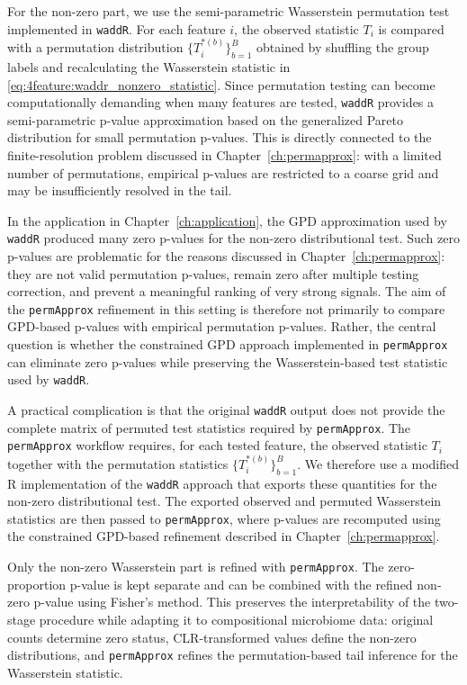 For the non-zero part, we use the semi-parametric Wasserstein permutation test implemented in \texttt{waddR}. For each feature $i$, the observed statistic $T_i$ is compared with a permutation distribution $\{T_i^{*(b)}\}_{b=1}^B$ obtained by shuffling the group labels and recalculating the Wasserstein statistic in \eqref{eq:4feature:waddr_nonzero_statistic}. Since permutation testing can become computationally demanding when many features are tested, \texttt{waddR} provides a semi-parametric p-value approximation based on the generalized Pareto distribution for small permutation p-values. This is directly connected to the finite-resolution problem discussed in Chapter~\ref{ch:permapprox}: with a limited number of permutations, empirical p-values are restricted to a coarse grid and may be insufficiently resolved in the tail.

In the application in Chapter~\ref{ch:application}, the GPD approximation used by \texttt{waddR} produced many zero p-values for the non-zero distributional test. Such zero p-values are problematic for the reasons discussed in Chapter~\ref{ch:permapprox}: they are not valid permutation p-values, remain zero after multiple testing correction, and prevent a meaningful ranking of very strong signals. The aim of the \texttt{permApprox} refinement in this setting is therefore not primarily to compare GPD-based p-values with empirical permutation p-values. Rather, the central question is whether the constrained GPD approach implemented in \texttt{permApprox} can eliminate zero p-values while preserving the Wasserstein-based test statistic used by \texttt{waddR}.

A practical complication is that the original \texttt{waddR} output does not provide the complete matrix of permuted test statistics required by \texttt{permApprox}. The \texttt{permApprox} workflow requires, for each tested feature, the observed statistic $T_i$ together with the permutation statistics $\{T_i^{*(b)}\}_{b=1}^B$. We therefore use a modified R implementation of the \texttt{waddR} approach that exports these quantities for the non-zero distributional test. The exported observed and permuted Wasserstein statistics are then passed to \texttt{permApprox}, where p-values are recomputed using the constrained GPD-based refinement described in Chapter~\ref{ch:permapprox}.

Only the non-zero Wasserstein part is refined with \texttt{permApprox}. The zero-proportion p-value is kept separate and can be combined with the refined non-zero p-value using Fisher's method. This preserves the interpretability of the two-stage procedure while adapting it to compositional microbiome data: original counts determine zero status, CLR-transformed values define the non-zero distributions, and \texttt{permApprox} refines the permutation-based tail inference for the Wasserstein statistic.

